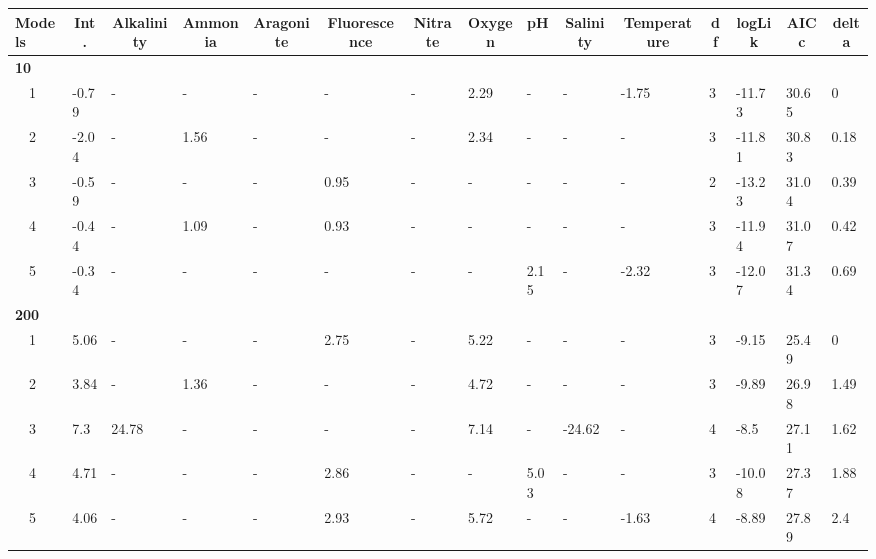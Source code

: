 \documentclass[letterpaper,12pt]{article}\usepackage[]{graphicx}\usepackage[]{color}
\begin{document}
\begin{landscape}
\begin{table}[!tbp]
{\begin{center}
\begin{tabular}{lllllllllllllll}
\hline\hline
\multicolumn{1}{l}{Models}&\multicolumn{1}{c}{Int.}&\multicolumn{1}{c}{Alkalinity}&\multicolumn{1}{c}{Ammonia}&\multicolumn{1}{c}{Aragonite}&\multicolumn{1}{c}{Fluorescence}&\multicolumn{1}{c}{Nitrate}&\multicolumn{1}{c}{Oxygen}&\multicolumn{1}{c}{pH}&\multicolumn{1}{c}{Salinity}&\multicolumn{1}{c}{Temperature}&\multicolumn{1}{c}{df}&\multicolumn{1}{c}{logLik}&\multicolumn{1}{c}{AICc}&\multicolumn{1}{c}{delta}\tabularnewline
\hline
{\bfseries 10}&&&&&&&&&&&&&&\tabularnewline
~~1&-0.79&-&-&-&-&-&2.29&-&-&-1.75&3&-11.73&30.65&0\tabularnewline
~~2&-2.04&-&1.56&-&-&-&2.34&-&-&-&3&-11.81&30.83&0.18\tabularnewline
~~3&-0.59&-&-&-&0.95&-&-&-&-&-&2&-13.23&31.04&0.39\tabularnewline
~~4&-0.44&-&1.09&-&0.93&-&-&-&-&-&3&-11.94&31.07&0.42\tabularnewline
~~5&-0.34&-&-&-&-&-&-&2.15&-&-2.32&3&-12.07&31.34&0.69\tabularnewline
\hline
{\bfseries 200}&&&&&&&&&&&&&&\tabularnewline
~~1&5.06&-&-&-&2.75&-&5.22&-&-&-&3&-9.15&25.49&0\tabularnewline
~~2&3.84&-&1.36&-&-&-&4.72&-&-&-&3&-9.89&26.98&1.49\tabularnewline
~~3&7.3&24.78&-&-&-&-&7.14&-&-24.62&-&4&-8.5&27.11&1.62\tabularnewline
~~4&4.71&-&-&-&2.86&-&-&5.03&-&-&3&-10.08&27.37&1.88\tabularnewline
~~5&4.06&-&-&-&2.93&-&5.72&-&-&-1.63&4&-8.89&27.89&2.4\tabularnewline
\hline
\end{tabular}\end{center}}
\end{table}

\end{landscape}
\end{document}
